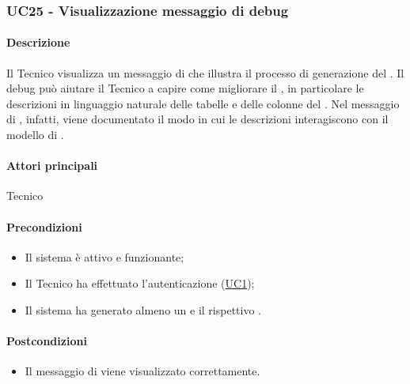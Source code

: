 \subsubsection{UC25 - Visualizzazione messaggio di debug}\label{UC25}
\paragraph*{Descrizione}
Il Tecnico visualizza un messaggio di  che illustra il processo di generazione del . Il debug può aiutare il Tecnico a capire come migliorare il , in particolare le descrizioni in linguaggio naturale delle tabelle e delle colonne del . Nel messaggio di , infatti, viene documentato il modo in cui le descrizioni interagiscono con il modello di .

\paragraph*{Attori principali}
Tecnico

\paragraph*{Precondizioni}
\begin{itemize}
  \item Il sistema è attivo e funzionante;
  \item Il Tecnico ha effettuato l'autenticazione (\hyperref[UC1]{UC1});
  \item Il sistema ha generato almeno un  e il rispettivo .
\end{itemize}

\paragraph*{Postcondizioni}
\begin{itemize}
  \item Il messaggio di  viene visualizzato correttamente.
\end{itemize}

